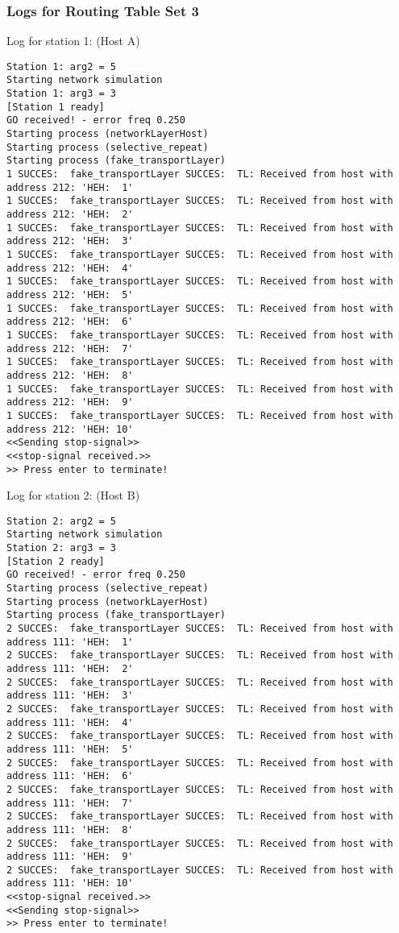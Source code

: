 \subsubsection{Logs for Routing Table Set 3}
Log for station 1: (Host A)
\begin{lstlisting}[breaklines=true]
Station 1: arg2 = 5
Starting network simulation
Station 1: arg3 = 3
[Station 1 ready]
GO received! - error freq 0.250
Starting process (networkLayerHost)
Starting process (selective_repeat)
Starting process (fake_transportLayer)
1 SUCCES:  fake_transportLayer SUCCES:  TL: Received from host with address 212: 'HEH:  1'
1 SUCCES:  fake_transportLayer SUCCES:  TL: Received from host with address 212: 'HEH:  2'
1 SUCCES:  fake_transportLayer SUCCES:  TL: Received from host with address 212: 'HEH:  3'
1 SUCCES:  fake_transportLayer SUCCES:  TL: Received from host with address 212: 'HEH:  4'
1 SUCCES:  fake_transportLayer SUCCES:  TL: Received from host with address 212: 'HEH:  5'
1 SUCCES:  fake_transportLayer SUCCES:  TL: Received from host with address 212: 'HEH:  6'
1 SUCCES:  fake_transportLayer SUCCES:  TL: Received from host with address 212: 'HEH:  7'
1 SUCCES:  fake_transportLayer SUCCES:  TL: Received from host with address 212: 'HEH:  8'
1 SUCCES:  fake_transportLayer SUCCES:  TL: Received from host with address 212: 'HEH:  9'
1 SUCCES:  fake_transportLayer SUCCES:  TL: Received from host with address 212: 'HEH: 10'
<<Sending stop-signal>>
<<stop-signal received.>>
>> Press enter to terminate!
\end{lstlisting}

Log for station 2: (Host B)
\begin{lstlisting}[breaklines=true]
Station 2: arg2 = 5
Starting network simulation
Station 2: arg3 = 3
[Station 2 ready]
GO received! - error freq 0.250
Starting process (selective_repeat)
Starting process (networkLayerHost)
Starting process (fake_transportLayer)
2 SUCCES:  fake_transportLayer SUCCES:  TL: Received from host with address 111: 'HEH:  1'
2 SUCCES:  fake_transportLayer SUCCES:  TL: Received from host with address 111: 'HEH:  2'
2 SUCCES:  fake_transportLayer SUCCES:  TL: Received from host with address 111: 'HEH:  3'
2 SUCCES:  fake_transportLayer SUCCES:  TL: Received from host with address 111: 'HEH:  4'
2 SUCCES:  fake_transportLayer SUCCES:  TL: Received from host with address 111: 'HEH:  5'
2 SUCCES:  fake_transportLayer SUCCES:  TL: Received from host with address 111: 'HEH:  6'
2 SUCCES:  fake_transportLayer SUCCES:  TL: Received from host with address 111: 'HEH:  7'
2 SUCCES:  fake_transportLayer SUCCES:  TL: Received from host with address 111: 'HEH:  8'
2 SUCCES:  fake_transportLayer SUCCES:  TL: Received from host with address 111: 'HEH:  9'
2 SUCCES:  fake_transportLayer SUCCES:  TL: Received from host with address 111: 'HEH: 10'
<<stop-signal received.>>
<<Sending stop-signal>>
>> Press enter to terminate!
\end{lstlisting}

